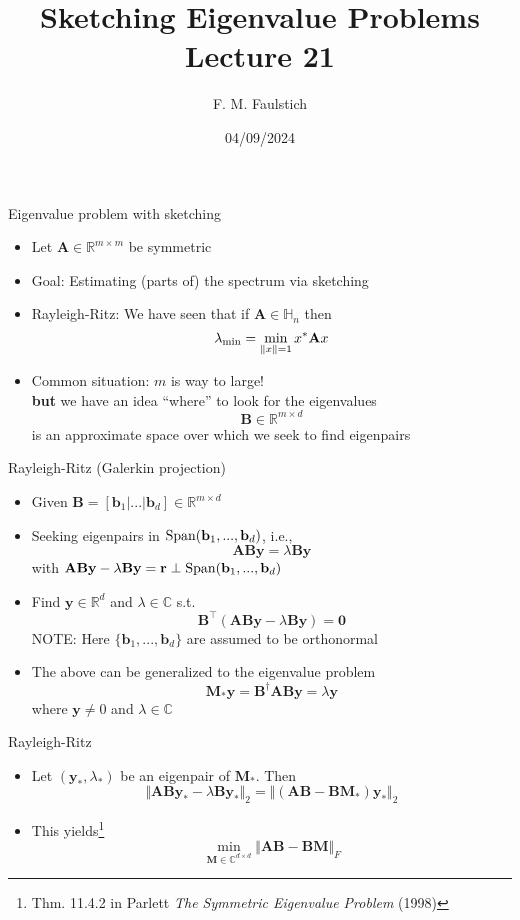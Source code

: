 \documentclass{beamer}
\title{
Sketching Eigenvalue Problems\\
Lecture 21
}
\author{F. M. Faulstich}
\date{04/09/2024}
\newcommand{\bgk}[1]{\boldsymbol{#1}}
\newcommand{\bzero}{\bgk{0}}
\newcommand{\bvec}[1]{\mathbf{#1}}
\newcommand{\vb}{\bvec{b}}
\newcommand{\vr}{\bvec{r}}
\newcommand{\vy}{\bvec{y}}
\newcommand{\vA}{\bvec{A}}
\newcommand{\vB}{\bvec{B}}
\newcommand{\vM}{\bvec{M}}
\newcommand{\bitem}{\item[$\bullet$]}
\begin{document}
\frame{\titlepage}

\begin{frame}{Eigenvalue problem with sketching}

\begin{itemize}
    \bitem Let $\vA \in \mathbb{R}^{m\times m}$ be symmetric
    \bitem Goal: Estimating (parts of) the spectrum via sketching
    \bitem Rayleigh-Ritz: We have seen that if $\vA \in\mathbb{H}_n$ then 
    $$
    \lambda_{\rm min}
    =
    \min_{\Vert x \Vert = 1} x^* \vA x
    $$
    \bitem Common situation: $m$ is way to large!\\
    {\bf but} we have an idea ``where'' to look for the eigenvalues
    $$
    \vB \in \mathbb{R}^{m \times d}
    $$
    is an approximate space over which we seek to find eigenpairs
\end{itemize}
    
\end{frame}


\begin{frame}{Rayleigh-Ritz (Galerkin projection)}


\begin{itemize}
    \bitem Given $\vB= [\vb_1|...|\vb_d] \in \mathbb{R}^{m \times d}$ 
    \bitem Seeking eigenpairs in ${\rm Span}(\vb_1,...,\vb_d)$, i.e.,
    $$
    \vA \vB \vy= \lambda \vB \vy
    $$ 
    with $\vA \vB \vy - \lambda \vB \vy = \vr \perp {\rm Span}(\vb_1,...,\vb_d)$ 
    \bitem Find $\vy \in \mathbb{R}^{d}$ and $\lambda \in \mathbb{C}$ s.t.
    $$
    \vB^\top(\vA \vB \vy- \lambda \vB \vy)= \bzero
    $$
    NOTE: Here $\{\vb_1,...,\vb_d\}$ are assumed to be orthonormal
    \bitem The above can be generalized to the eigenvalue problem
    $$
    \vM_*\vy = \vB^\dagger \vA \vB \vy= \lambda  \vy
    $$
    where $\vy \neq 0$ and $\lambda\in\mathbb{C}$
\end{itemize}

\end{frame}

\begin{frame}{Rayleigh-Ritz}

\begin{itemize}
    \bitem Let $(\vy_*, \lambda_*)$ be an eigenpair of $\vM_*$. Then
    $$
    \Vert \vA \vB \vy_*- \lambda \vB \vy_* \Vert_2
    =
    \Vert (\vA \vB- \vB \vM_*) \vy_* \Vert_2
    $$
    \bitem This yields\footnote{Thm. 11.4.2 in Parlett {\it The Symmetric Eigenvalue Problem} (1998)}
    $$
    \min_{\vM \in \mathbb{C}^{d\times d}}
    \Vert \vA\vB - \vB \vM \Vert_F
    $$
\end{itemize}
    
\end{frame}
\end{document}
